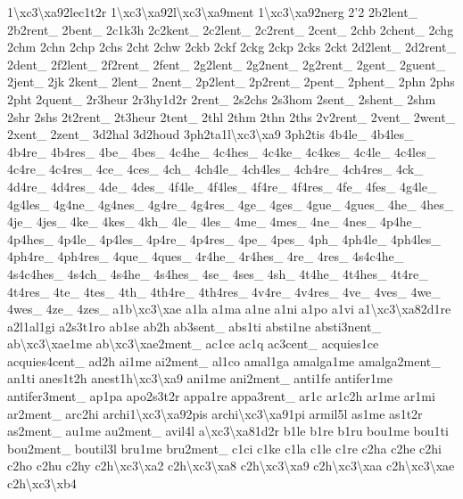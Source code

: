 \begin{DoxyCompactItemize}
1\textbackslash{}xc3\textbackslash{}xa92lec1t2r 1\textbackslash{}xc3\textbackslash{}xa92l\textbackslash{}xc3\textbackslash{}xa9ment 1\textbackslash{}xc3\textbackslash{}xa92nerg 2'2 2b2lent\-\_\- 2b2rent\-\_\- 2bent\-\_\- 2c1k3h 2c2kent\-\_\- 2c2lent\-\_\- 2c2rent\-\_\- 2cent\-\_\- 2chb 2chent\-\_\- 2chg 2chm 2chn 2chp 2chs 2cht 2chw 2ckb 2ckf 2ckg 2ckp 2cks 2ckt 2d2lent\-\_\- 2d2rent\-\_\- 2dent\-\_\- 2f2lent\-\_\- 2f2rent\-\_\- 2fent\-\_\- 2g2lent\-\_\- 2g2nent\-\_\- 2g2rent\-\_\- 2gent\-\_\- 2guent\-\_\- 2jent\-\_\- 2jk 2kent\-\_\- 2lent\-\_\- 2nent\-\_\- 2p2lent\-\_\- 2p2rent\-\_\- 2pent\-\_\- 2phent\-\_\- 2phn 2phs 2pht 2quent\-\_\- 2r3heur 2r3hy1d2r 2rent\-\_\- 2s2chs 2s3hom 2sent\-\_\- 2shent\-\_\- 2shm 2shr 2shs 2t2rent\-\_\- 2t3heur 2tent\-\_\- 2thl 2thm 2thn 2ths 2v2rent\-\_\- 2vent\-\_\- 2went\-\_\- 2xent\-\_\- 2zent\-\_\- 3d2hal 3d2houd 3ph2ta1l\textbackslash{}xc3\textbackslash{}xa9 3ph2tis 4b4le\-\_\- 4b4les\-\_\- 4b4re\-\_\- 4b4res\-\_\- 4be\-\_\- 4bes\-\_\- 4c4he\-\_\- 4c4hes\-\_\- 4c4ke\-\_\- 4c4kes\-\_\- 4c4le\-\_\- 4c4les\-\_\- 4c4re\-\_\- 4c4res\-\_\- 4ce\-\_\- 4ces\-\_\- 4ch\-\_\- 4ch4le\-\_\- 4ch4les\-\_\- 4ch4re\-\_\- 4ch4res\-\_\- 4ck\-\_\- 4d4re\-\_\- 4d4res\-\_\- 4de\-\_\- 4des\-\_\- 4f4le\-\_\- 4f4les\-\_\- 4f4re\-\_\- 4f4res\-\_\- 4fe\-\_\- 4fes\-\_\- 4g4le\-\_\- 4g4les\-\_\- 4g4ne\-\_\- 4g4nes\-\_\- 4g4re\-\_\- 4g4res\-\_\- 4ge\-\_\- 4ges\-\_\- 4gue\-\_\- 4gues\-\_\- 4he\-\_\- 4hes\-\_\- 4je\-\_\- 4jes\-\_\- 4ke\-\_\- 4kes\-\_\- 4kh\-\_\- 4le\-\_\- 4les\-\_\- 4me\-\_\- 4mes\-\_\- 4ne\-\_\- 4nes\-\_\- 4p4he\-\_\- 4p4hes\-\_\- 4p4le\-\_\- 4p4les\-\_\- 4p4re\-\_\- 4p4res\-\_\- 4pe\-\_\- 4pes\-\_\- 4ph\-\_\- 4ph4le\-\_\- 4ph4les\-\_\- 4ph4re\-\_\- 4ph4res\-\_\- 4que\-\_\- 4ques\-\_\- 4r4he\-\_\- 4r4hes\-\_\- 4re\-\_\- 4res\-\_\- 4s4c4he\-\_\- 4s4c4hes\-\_\- 4s4ch\-\_\- 4s4he\-\_\- 4s4hes\-\_\- 4se\-\_\- 4ses\-\_\- 4sh\-\_\- 4t4he\-\_\- 4t4hes\-\_\- 4t4re\-\_\- 4t4res\-\_\- 4te\-\_\- 4tes\-\_\- 4th\-\_\- 4th4re\-\_\- 4th4res\-\_\- 4v4re\-\_\- 4v4res\-\_\- 4ve\-\_\- 4ves\-\_\- 4we\-\_\- 4wes\-\_\- 4ze\-\_\- 4zes\-\_\- a1b\textbackslash{}xc3\textbackslash{}xae a1la a1ma a1ne a1ni a1po a1vi a1\textbackslash{}xc3\textbackslash{}xa82d1re a2l1al1gi a2s3t1ro ab1se ab2h ab3sent\-\_\- abs1ti absti1ne absti3nent\-\_\- ab\textbackslash{}xc3\textbackslash{}xae1me ab\textbackslash{}xc3\textbackslash{}xae2ment\-\_\- ac1ce ac1q ac3cent\-\_\- acquies1ce acquies4cent\-\_\- ad2h ai1me ai2ment\-\_\- al1co amal1ga amalga1me amalga2ment\-\_\- an1ti anes1t2h anest1h\textbackslash{}xc3\textbackslash{}xa9 ani1me ani2ment\-\_\- anti1fe antifer1me antifer3ment\-\_\- ap1pa apo2s3t2r appa1re appa3rent\-\_\- ar1c ar1c2h ar1me ar1mi ar2ment\-\_\- arc2hi archi1\textbackslash{}xc3\textbackslash{}xa92pis archi\textbackslash{}xc3\textbackslash{}xa91pi armil5l as1me as1t2r as2ment\-\_\- au1me au2ment\-\_\- avil4l a\textbackslash{}xc3\textbackslash{}xa81d2r b1le b1re b1ru bou1me bou1ti bou2ment\-\_\- boutil3l bru1me bru2ment\-\_\- c1ci c1ke c1la c1le c1re c2ha c2he c2hi c2ho c2hu c2hy c2h\textbackslash{}xc3\textbackslash{}xa2 c2h\textbackslash{}xc3\textbackslash{}xa8 c2h\textbackslash{}xc3\textbackslash{}xa9 c2h\textbackslash{}xc3\textbackslash{}xaa c2h\textbackslash{}xc3\textbackslash{}xae c2h\textbackslash{}xc3\textbackslash{}xb4 
\end{DoxyCompactItemize}
